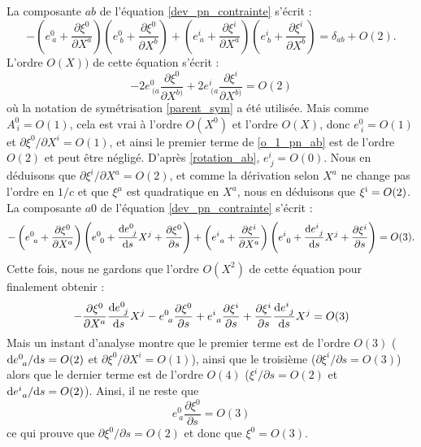 			La composante $ab$ de l'équation \ref{dev_pn_contrainte} s'écrit :
			\begin{equation}
				-\left(e^0_{\ a}+\frac{\partial \xi^0}{\partial X^a}\right)\left(e^0_{\ b}+\frac{\partial \xi^0}{\partial X^b}\right)
				+\left( e^i_{\ a} + \frac{\partial \xi^i}{\partial X^a} \right)\left( e^i_{\ b} + \frac{\partial \xi^i}{\partial X^b} \right)
				=\delta_{ab}+O(2).
			\end{equation}
			L'ordre $O(X))$ de cette équation s'écrit :
			\begin{equation}\label{o_1_pn_ab}
				-2e^0_{\ (a}\frac{\partial \xi^0}{\partial X^{b)}}+2e^i_{\ (a}\frac{\partial \xi^i}{\partial X^{b)}}=O(2)
			\end{equation}
			où la notation de symétrisation \ref{parent_sym} a été utilisée.
			Mais comme $A^0_{\ i}=O(1)$, cela est vrai à l'ordre $O(X^0)$ et l'ordre $O(X)$, donc $e^0_{\ i}=O(1)$ et $\partial \xi^0/\partial X^i=O(1)$, et ainsi le premier terme de \ref{o_1_pn_ab} est de l'ordre $O(2)$ et peut être négligé. D'après \ref{rotation_ab}, $e^i_{\ j}=O(0)$. Nous en déduisons que $\partial \xi^i/\partial X^a=O(2)$, et comme la dérivation selon $X^a$ ne change pas l'ordre en $1/c$ et que $\xi^\mu$ est quadratique en $X^a$, nous en déduisons que $\xi^{\mathrm{i}}=O(2)$.
			La composante $a0$ de l'équation \ref{dev_pn_contrainte} s'écrit :
			\begin{equation}
				-\left(e^0_{\ a}+\frac{\partial \xi^0}{\partial X^a}\right)\left( e^0_{\ 0}+\frac{\mathrm{d} e^0_{\ j}}{\mathrm{d} s}X^j +\frac{\partial \xi^0}{\partial s} \right)
				+\left( e^i_{\ a} + \frac{\partial \xi^i}{\partial X^a} \right)\left( e^i_{\ 0} + \frac{\mathrm{d} e^i_{\ j}}{\mathrm{d} s}X^j +\frac{\partial \xi^i}{\partial s} \right) 
				= O(3).
			\end{equation}
			Cette fois, nous ne gardons que l'ordre $O(X^2)$ de cette équation pour finalement obtenir :
			\begin{equation}
				-\frac{\partial \xi^0}{\partial X^a}\frac{\d e^0_{\ j}}{\d s}X^j-e^0_{\ a}\frac{\partial \xi^0}{\partial s} + e^i_{\ a}\frac{\partial \xi^i}{\partial s} + \frac{\partial \xi^i}{\partial s}\frac{\d e^i_{\ j}}{\d s}X^j = O(3)
			\end{equation}
			Mais un instant d'analyse montre que le premier terme est de l'ordre $O(3)$ ($\mathrm{d} e^0_{\ a}/\mathrm{d} s=O(2)$ et $\partial \xi^0/\partial X^i=O(1)$), ainsi que le troisième ($\partial \xi^i/\partial s=O(3)$) alors que le dernier terme est de l'ordre $O(4)$ (\partial $\xi^i/\partial s=O(2)$ et $\mathrm{d} e^i_{\ a}/\mathrm{d} s=O(2)$). Ainsi, il ne reste que
			\begin{equation}
				e^0_{\ a}\frac{\partial \xi^0}{\partial s}=O(3)
			\end{equation}
			ce qui prouve que $\partial \xi^0/\partial s=O(2)$ et donc que $\xi^0=O(3)$. 

